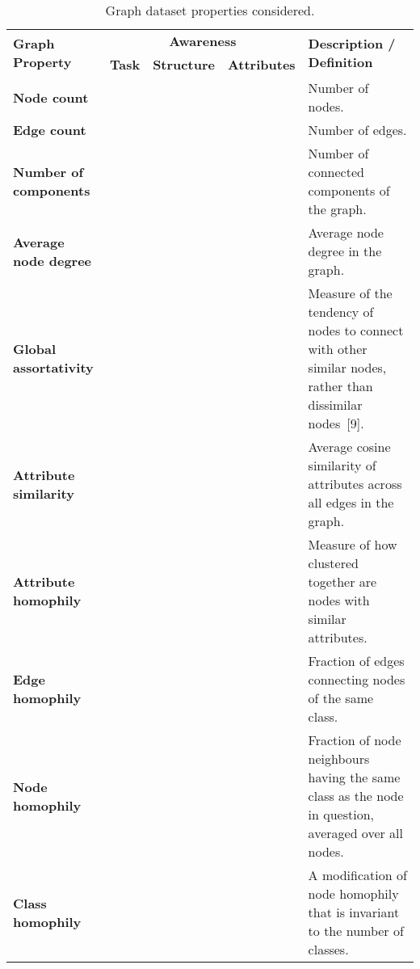 \begin{table*}[h]
	\caption{Graph dataset properties considered.}
	\label{tab:graph-properties}
	\centering
	\begin{tabularx}{\linewidth}{XcccX}
		\toprule
		\multirow{2}{*}{\textbf{Graph Property}}           & \multicolumn{3}{c}{\textbf{Awareness}}                   & \multirow{2}{*}{\textbf{Description / Definition}} \\
		\cmidrule(lr){2-4}
		                                                   & \textbf{Task} & \textbf{Structure} & \textbf{Attributes} & \\
		\midrule
		\textbf{Node count}                                & \crossmark    & \crossmark         & \crossmark          & Number of nodes. \\
		\textbf{Edge count}                                & \crossmark    & \crossmark         & \crossmark          & Number of edges. \\
		\textbf{Number of components}                      & \crossmark    & \checkmark         & \crossmark          & Number of connected components of the graph. \\
		\textbf{Average node degree}                       & \crossmark    & \checkmark         & \crossmark          & Average node degree in the graph. \\
		\textbf{Global assortativity}                      & \crossmark    & \checkmark         & \crossmark          & Measure of the tendency of nodes to connect with other similar nodes, rather than dissimilar nodes~[9]. \\
		\textbf{Attribute similarity}                      & \crossmark    & \checkmark         & \checkmark          & Average cosine similarity of attributes across all edges in the graph. \\
		\textbf{Attribute homophily}                       & \checkmark    & \checkmark         & \crossmark          & Measure of how clustered together are nodes with similar attributes. \\
		\textbf{Edge homophily}                            & \checkmark    & \checkmark         & \crossmark          & Fraction of edges connecting nodes of the same class. \\
		\textbf{Node homophily}                            & \checkmark    & \checkmark         & \crossmark          & Fraction of node neighbours having the same class as the node in question, averaged over all nodes. \\
		\textbf{Class homophily}                           & \checkmark    & \checkmark         & \crossmark          & A modification of node homophily that is invariant to the number of classes. \\

\end{tabularx}
\end{table*}
